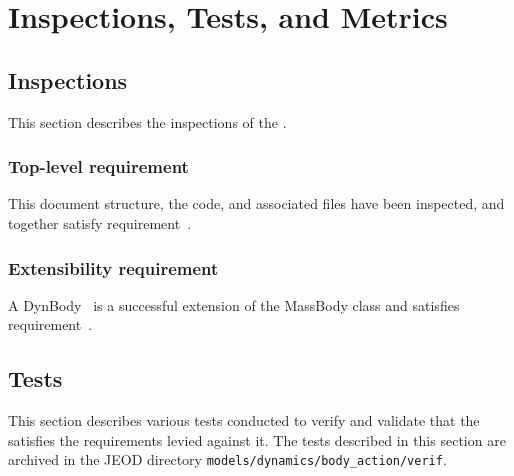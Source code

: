 \chapter{Inspections, Tests, and Metrics}\label{ch:ivv}
\section{Inspections}\label{sec:inspect}
This section describes the inspections of the \ModelDesc.

\subsection{Top-level requirement}
\label{inspect:jeod}
 This document structure, the code, and associated files have been inspected, 
 and together satisfy requirement~.

 
\subsection{Extensibility requirement}
\label{inspect:mass_extend}
 A DynBody~\cite{dynenv:DYNBODY} is a successful extension of the MassBody 
 class and satisfies requirement~.

\section{Tests}
This section describes various tests conducted to verify and validate
that the \ModelDesc satisfies the requirements levied against it.
The tests described in this section
are archived in the JEOD directory \verb+models/dynamics/body_action/verif+.



\newpage
\boilerplatetraceability
%

\newpage
\boilerplatemetrics
